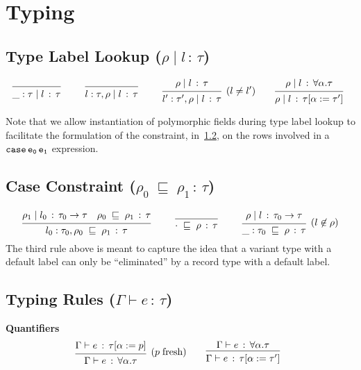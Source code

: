 \documentclass{article}
\newcommand{\G}{\Gamma}
\newcommand{\case}[2]{\tt{case}\,#1\,#2}
\newcommand{\hastp}[3]{#1 \vdash #2 \,:\, #3}
\newcommand{\haslbl}[3]{#1\;|\;#2\,:\, #3}
\newcommand{\caseVarRcd}[3]{#1 \;\sqsubseteq\; #2 \,:\, #3}
\newcommand{\deduct}[3][]
{
  \begin{prooftree}
    \hypo{#2}
    \infer1[\text{#1}]{#3}
  \end{prooftree}
}
\begin{document}
\section{Typing}

\subsection{Type Label Lookup \;($\haslbl{\rho}{l}{\tau}$)}
\label{subsec:type-lookup}
\[
\deduct
    {}
    {\haslbl{\_ : \tau}{l}{\tau}}
    {}
\qquad
\deduct
    {}
    {\haslbl{l:\tau,\rho}{l}{\tau}}
    {}
\qquad
\deduct
    {\haslbl{\rho}{l}{\tau}}
    {\haslbl{l':\tau',\rho}{l}{\tau}}
    {(l \neq l')}
\qquad
\deduct
    {\haslbl{\rho}{l}{\forall\alpha.\tau}}
    {\haslbl{\rho}{l}{\tau[\alpha := \tau']}}
    {}
\]

Note that we allow instantiation of polymorphic fields during type
label lookup to facilitate the formulation of the constraint, in~\ref{subsec:case-constraint}, on
the rows involved in a $\case{e_0}{e_1}$ expression.

\subsection{Case Constraint \;($\caseVarRcd{\rho_0}{\rho_1}{\tau}$)}
\label{subsec:case-constraint}
\[
\deduct
    {\haslbl{\rho_1}{l_0}{\tau_0\to\tau} \quad \caseVarRcd{\rho_0}{\rho_1}{\tau}}
    {\caseVarRcd{l_0:\tau_0,\rho_0}{\rho_1}{\tau}}
    {}
\qquad
\deduct
    {}
    {\caseVarRcd{\cdot}{\rho}{\tau}}
    {}
\qquad
\deduct
    {\haslbl{\rho}{l}{\tau_0\to\tau}}
    {\caseVarRcd{\_:\tau_0}{\rho}{\tau}}
    {(l\not\in\rho)}
\]
The third rule above is meant to capture the idea that a variant type
with a default label can only be ``eliminated'' by a record type with a
default label.

\subsection{Typing Rules \;($\hastp{\G}{e}{\tau}$)}

\textbf{Quantifiers}
\[
\deduct
    {\hastp{\G}{e}{\tau[\alpha := p]}}
    {\hastp{\G}{e}{\forall \alpha . \tau}}
    {(p\;\text{fresh})}
\qquad
\deduct
    {\hastp{\G}{e}{\forall \alpha.\tau}}
    {\hastp{\G}{e}{\tau[\alpha := \tau']}}
    {}
\]
\end{document}
